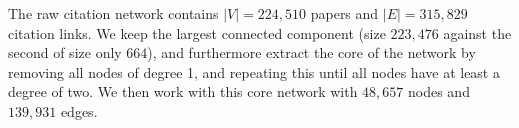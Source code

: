 \documentclass[letterpaper]{article}
\begin{document}



The raw citation network contains $\left|V\right| = 224,510$ papers and $\left|E\right| = 315,829$ citation links. We keep the largest connected component (size $223,476$ against the second of size only $664$), and furthermore extract the core of the network by removing all nodes of degree 1, and repeating this until all nodes have at least a degree of two. We then work with this core network with $48,657$ nodes and $139,931$ edges.








\end{document}
